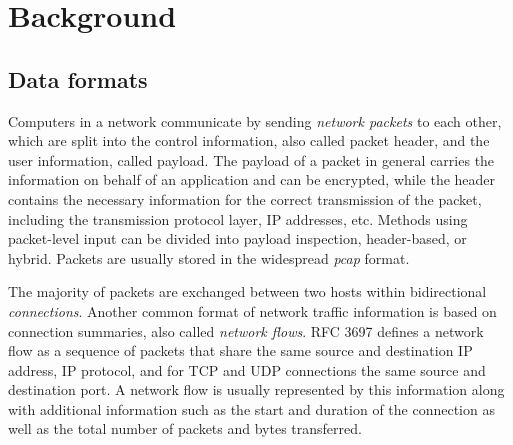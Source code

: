 \documentclass[sigconf]{acmart}
\begin{document}
\section{Background}\label{Sec:background}

\subsection{Data formats}

Computers in a network communicate by sending \emph{network packets} to each other, which are split into the control information, also called packet header, and the user information, called payload. The payload of a packet in general carries the information on behalf of an application and can be encrypted, while the header contains the necessary information for the correct transmission of the packet, including the transmission protocol layer, IP addresses, etc. Methods using packet-level input can be divided into payload inspection, header-based, or hybrid. Packets are usually stored in the widespread \emph{pcap} format.


The majority of packets are exchanged between two hosts within bidirectional \emph{connections}. Another common format of network traffic information is based on connection summaries, also called \emph{network flows}. RFC 3697 \cite{brownlee1999traffic} defines a network flow as a sequence of packets that share the same source and destination IP address, IP protocol, and for TCP and UDP connections the same source and destination port. A network flow is usually represented by this information along with additional information such as the start and duration of the connection as well as the total number of packets and bytes transferred. 



\end{document}
